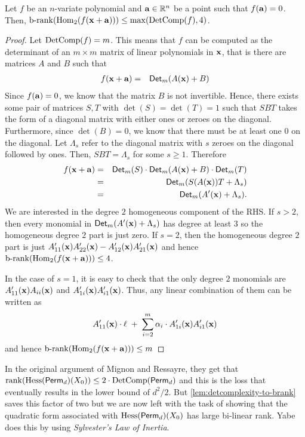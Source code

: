 {\begin{lemma}\label{lem:detcomplexity-to-brank} Let $f$ be an $n$-variate polynomial and $\mathbf{a} \in \mathbb{R}^n$ be a point such that $f(\mathbf{a}) = 0$. Then, $\operatorname{b-rank}(\operatorname{Hom}_2(f(\mathbf{x} + \mathbf{a}))) \leq \max(\operatorname{DetComp}(f),4)$. 
\end{lemma}
\begin{proof}
Let $\operatorname{DetComp}(f) = m$. This means that $f$ can be computed as the determinant of an $m\times m$ matrix of linear polynomials in $\mathbf{x}$, that is there are matrices $A$ and $B$ such that  
\begin{eqnarray*}
f(\mathbf{x} + \mathbf{a}) & = & \operatorname{\mathsf{Det}}_m(A(\mathbf{x}) + B)
\end{eqnarray*}
Since $f(\mathbf{a}) = 0$, we know that the matrix $B$ is not invertible. Hence, there exists some pair of matrices $S, T$ with $\det(S) = \det(T) = 1$ such that $S B T$ takes the form of a diagonal matrix with either ones or zeroes on the diagonal. Furthermore, since $\det(B) = 0$, we know that there must be at least one $0$ on the diagonal. Let $\Lambda_s$ refer to the diagonal matrix with $s$ zeroes on the diagonal followed by ones. Then, $S B T = \Lambda_s$ for some $s \geq 1$. Therefore 
\begin{eqnarray*}
f(\mathbf{x} + \mathbf{a}) & = & \operatorname{\mathsf{Det}}_m(S) \cdot \operatorname{\mathsf{Det}}_m(A(\mathbf{x}) + B) \cdot \operatorname{\mathsf{Det}}_m(T)\\
 & = & \operatorname{\mathsf{Det}}_m( S (A(\mathbf{x})) T + \Lambda_s)\\
 & = & \operatorname{\mathsf{Det}}_m( A'(\mathbf{x}) + \Lambda_s).
\end{eqnarray*}
We are interested in the degree $2$ homogeneous component of the RHS. If $s > 2$, then every monomial in $\operatorname{\mathsf{Det}}_m(A'(\mathbf{x}) + \Lambda_s)$ has degree at least $3$ so the homogeneous degree $2$ part is just zero. If $s = 2$, then the homogeneous degree $2$ part is just $A'_{11}(\mathbf{x}) A'_{22}(\mathbf{x}) - A'_{12}(\mathbf{x}) A'_{21}(\mathbf{x})$ and hence $\operatorname{b-rank}(\operatorname{Hom}_2(f(\mathbf{x} + \mathbf{a})))\leq 4$. 

In the case of $s = 1$, it is easy to check that the only degree $2$ monomials are $A_{11}'(\mathbf{x}) A_{ii}(\mathbf{x})$ and $A_{1i}'(\mathbf{x}) A_{i1}'(\mathbf{x})$. Thus, any linear combination of them can be written as
\[
A_{11}'(\mathbf{x}) \cdot \ell  \;+\;  \sum_{i=2}^m \alpha_i \cdot A_{1i}'(\mathbf{x})A_{i1}'(\mathbf{x})
\]
and hence $\operatorname{b-rank}(\operatorname{Hom}_2(f(\mathbf{x} + \mathbf{a}))) \leq m$
\end{proof}

In the original argument of Mignon and Ressayre, they get that $\operatorname{rank}(\operatorname{Hess}(\operatorname{\mathsf{Perm}}_d)(X_0)) \leq 2 \cdot \operatorname{DetComp}(\operatorname{\mathsf{Perm}}_d)$ and this is the loss that eventually results in the lower bound of $d^2/2$. But \autoref{lem:detcomplexity-to-brank} saves this factor of two but we are now left with the task of showing that the quadratic form associated with $\operatorname{Hess}(\operatorname{\mathsf{Perm}}_d)(X_0)$ has large bi-linear rank. Yabe~\cite{Yabe15} does this by using \emph{Sylvester's Law of Inertia}.

}

